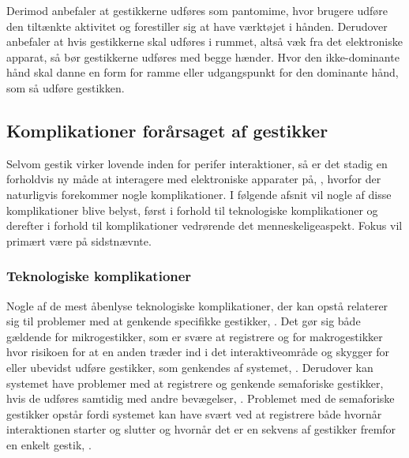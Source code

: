 Derimod anbefaler \textcite[s. 823]{PDF:UnderstandingNaturalness} at gestikkerne udføres som pantomime, hvor brugere udføre den tiltænkte aktivitet og forestiller sig at have værktøjet i hånden. Derudover anbefaler \textcite[s. 824]{PDF:UnderstandingNaturalness} at hvis gestikkerne skal udføres i rummet, altså væk fra det elektroniske apparat, så bør gestikkerne udføres med begge hænder. Hvor den ikke-dominante hånd skal danne en form for ramme eller udgangspunkt for den dominante hånd, som så udføre gestikken.      
%
\subsection{Komplikationer forårsaget af gestikker}
\label{KomplikationerGestikker}
%
Selvom gestik virker lovende inden for perifer interaktioner, så er det stadig en forholdvis ny måde at interagere med elektroniske apparater på, \parencite[s. 163]{PDF:ComparingInputModalities}, hvorfor der naturligvis forekommer nogle komplikationer. I følgende afsnit vil nogle af disse komplikationer blive belyst, først i forhold til teknologiske komplikationer og derefter i forhold til komplikationer vedrørende det menneskeligeaspekt. Fokus vil primært være på sidstnævnte.
%
\subsubsection{Teknologiske komplikationer}
\label{TeknologiskeKomplikationer}
%
Nogle af de mest åbenlyse teknologiske komplikationer, der kan opstå relaterer sig til problemer med at genkende specifikke gestikker, \parencite[s. 27]{PDF:ATaxonomyOfGestures}. Det gør sig både gældende for mikrogestikker, som er svære at registrere og for makrogestikker hvor risikoen for at en anden træder ind i det interaktiveområde og skygger for eller ubevidst udføre gestikker, som genkendes af systemet, \parencite[s. 9]{PDF:UsabilityofMicroVsMacroGestures}. Derudover kan systemet have problemer med at registrere og genkende semaforiske gestikker, hvis de udføres samtidig med andre bevægelser, \parencite[s. 27]{PDF:ATaxonomyOfGestures}. Problemet med de semaforiske gestikker opstår fordi systemet kan have svært ved at registrere både hvornår interaktionen starter og slutter og hvornår det er en sekvens af gestikker fremfor en enkelt gestik, \parencite[s. 27]{PDF:ATaxonomyOfGestures}. 

